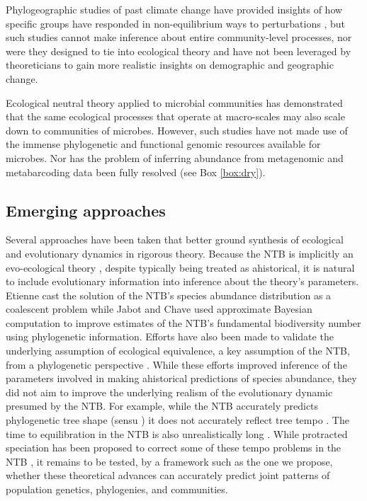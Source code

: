 \documentclass[12pt]{article}
\newcounter{Box}
\begin{document}
Phylogeographic studies of past climate change have provided insights
of how specific groups have responded in non-equilibrium ways to
perturbations \citep{Arbogast2001-jx, Smith2012-db, Hickerson2005-ek,
  Satler2016-lb}, but such studies cannot make inference about entire
community-level processes, nor were they designed to tie into
ecological theory and have not been leveraged by theoreticians to gain
more realistic insights on demographic and geographic change.

Ecological neutral theory applied to microbial communities
\citep{Venkataraman2015-rk} has demonstrated that the same ecological
processes that operate at macro-scales may also scale down to
communities of microbes. However, such studies have not made use of
the immense phylogenetic and functional genomic resources available
for microbes. Nor has the problem of inferring abundance from
metagenomic and metabarcoding data been fully resolved (see Box
\ref{box:dry}).

\subsection{Emerging approaches}

Several approaches have been taken that better ground synthesis of
ecological and evolutionary dynamics in rigorous theory. Because the
NTB is implicitly an evo-ecological theory \citep{Hubbell2001-dx,
  Hubbell2005-ng}, despite typically being treated as ahistorical, it
is natural to include evolutionary information into inference about
the theory's parameters. Etienne cast the solution of the NTB's
species abundance distribution as a coalescent problem
\citep{Etienne2004-fm} while Jabot and Chave \citep{Jabot2009-xr} used
approximate Bayesian computation to improve estimates of the NTB's
fundamental biodiversity number using phylogenetic
information. Efforts have also been made to validate the underlying
assumption of ecological equivalence, a key assumption of the NTB,
from a phylogenetic perspective \citep{Burbrink2015-vx}. While these
efforts improved inference of the parameters involved in making
ahistorical predictions of species abundance, they did not aim to
improve the underlying realism of the evolutionary dynamic presumed by
the NTB. For example, while the NTB accurately predicts phylogenetic
tree shape (sensu \citep{Jabot2009-xr}) it does not accurately reflect
tree tempo \citep{Davies2011-mz}. The time to equilibration in the NTB
is also unrealistically long \citep{Ricklefs2006-tn}. While protracted
speciation has been proposed to correct some of these tempo problems
in the NTB \citep{Rosindell2010-gq}, it remains to be tested, by a
framework such as the one we propose, whether these theoretical
advances can accurately predict joint patterns of population genetics,
phylogenies, and communities.
\end{document}
